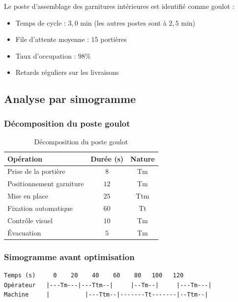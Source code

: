 \documentclass[a4paper,12pt]{article}
\begin{document}
Le poste d'assemblage des garnitures intérieures est identifié comme goulot :
\begin{itemize}
    \item Temps de cycle : $3,0$ min (les autres postes sont à $2,5$ min)
    \item File d'attente moyenne : $15$ portières
    \item Taux d'occupation : $98\%$
    \item Retards réguliers sur les livraisons
\end{itemize}

\subsection{Analyse par simogramme}

\subsubsection{Décomposition du poste goulot}

\begin{table}[ht]
\centering
\begin{tabular}{|l|c|c|}
\hline
\textbf{Opération} & \textbf{Durée (s)} & \textbf{Nature} \\
\hline
Prise de la portière & $8$ & Tm \\
Positionnement garniture & $12$ & Tm \\
Mise en place & $25$ & Ttm \\
Fixation automatique & $60$ & Tt \\
Contrôle visuel & $10$ & Tm \\
Évacuation & $5$ & Tm \\
\hline
\end{tabular}
\caption{Décomposition du poste goulot}
\end{table}

\subsubsection{Simogramme avant optimisation}

\begin{center}
\begin{minipage}{0.9\textwidth}
\begin{verbatim}
Temps (s)     0    20    40    60    80   100   120
Opérateur   |---Tm---|---Ttm--|     |--Tm--|     |---Tm---|
Machine     |          |---Ttm--|-------Tt-------|--Ttm--|
\end{verbatim}
\caption{Représentation simplifiée du simogramme avant optimisation}
\end{minipage}
\end{center}
\end{document}
